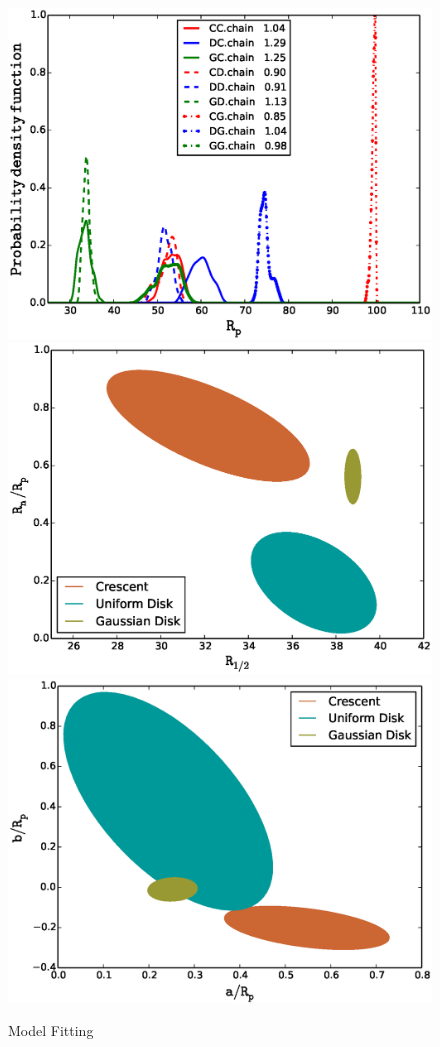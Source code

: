 \begin{figure}
\centering
  \includegraphics[width=0.95\hsize]{plots/Rp4all.eps}
  \includegraphics[width=0.48\hsize]{plots/Rhalf_RnRp.eps}
  \includegraphics[width=0.48\hsize]{plots/aRp_bRp.eps}
\caption{\label{fig:mcmc} Model Fitting}
\end{figure}


